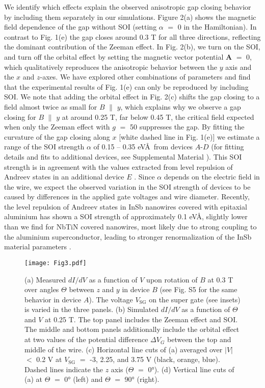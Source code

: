 We identify which effects explain the observed anisotropic gap closing behavior by including them separately in our simulations. Figure 2(a) shows the magnetic field dependence of the gap without SOI (setting $\alpha$ $=$ 0 in the Hamiltonian). In contrast to Fig. 1(e) the gap closes around 0.3 T for all three directions, reflecting the dominant contribution of the Zeeman effect. In Fig. 2(b), we turn on the SOI, and turn off the orbital effect by setting the magnetic vector potential $\mathbf{A}$ $=$ 0, which qualitatively reproduces the anisotropic behavior between the $y$ axis and the $x$ and $z$-axes. We have explored other combinations of parameters and find that the experimental results of Fig. 1(e) can only be reproduced by including SOI. We note that adding the orbital effect in Fig. 2(c) shifts the gap closing to a field almost twice as small for $B$ $\parallel$ $y$, which explains why we observe a gap closing for $B$ $\parallel$ $y$ at around 0.25 T, far below 0.45 T, the critical field expected when only the Zeeman effect with $g$ $=$ 50 suppresses the gap. By fitting the curvature of the gap closing \cite{VanHeck,Pan2018} along $x$ [white dashed line in Fig. 1(e)] we estimate a range of the SOI strength $\alpha$ of 0.15 -- 0.35 eV\AA\ from devices $A$-$D$ (for fitting details and fits to additional devices, see Supplemental Material \cite{Note1}). This SOI strength is in \mbox{agreement} with the values extracted from level repulsion of Andreev states \cite{Stanescu2013,DeMoor2018} in an additional device $E$ \cite{Note1}. \mbox{Since} $\alpha$ depends on the electric field in the wire, we expect the observed variation in the SOI strength of devices to be caused by differences in the applied gate voltages and wire diameter. Recently, the level repulsion of Andreev states in InSb nanowires covered with epitaxial aluminium has shown a SOI strength of approximately 0.1 eV\AA \cite{DeMoor2018}, slightly lower than we find for NbTiN covered nanowires, most likely due to strong coupling to the aluminium superconductor, leading to stronger renormalization of the InSb material parameters \cite{Stanescu2011,Cole2015,Antipov2018,Woods2018,Mikkelsen2018,Reeg2018}.
\begin{figure}
\texttt{[image: Fig3.pdf]}
\caption{\label{fig3}
    (a) Measured $dI/dV$ as a function of $V$ upon rotation of $B$ at 0.3 T over angles $\Theta$ between $z$ and $y$ in device $B$ (see Fig. S5 \cite{Note1} for the same behavior in device $A$). The voltage $V_{\mathrm{SG}}$ on the super gate (see insets) is varied in the three panels.
    (b) Simulated $dI/dV$ as a function of $\Theta$ and $V$ at 0.25 T. The top panel includes the Zeeman effect and SOI. The middle and bottom panels additionally include the orbital effect at two values of the potential difference $\Delta V_G$ between the top and middle of the wire. 
    (c) Horizontal line cuts of (a) averaged over $|V|$ $<$ 0.2 V at $V_{\mathrm{SG}}$ $=$ -3,  2.25, and 3.75 V (black, orange, blue). Dashed lines indicate the $z$ axis ($\Theta$ $=$ \ang{0}). (d) Vertical line cuts of (a) at $\Theta$ $=$ \ang{0} (left) and $\Theta$ $=$ \ang{90} (right).
}
\end{figure}
